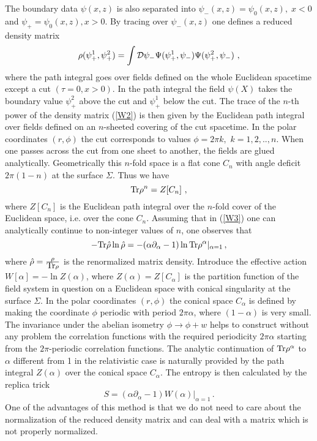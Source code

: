 \documentclass[12pt]{article}
\def\Tr{\hbox{Tr}}
\def\lb{\label}
\begin{document}
The boundary data $\psi(x,z)$ is also
separated into $\psi_-(x,z)=\psi_0(x,z),\; x<0$ and
$\psi_+=\psi_0(x,z),x>0$. By tracing over $\psi_-(x,z)$ one defines a reduced
density matrix
 \begin{equation}
  \rho(\psi_+^1,\psi_+^2)=\int {\cal D}\psi_-\Psi(\psi_+^1,\psi_-)\Psi(\psi_+^2,\psi_-)~,
 \lb{W2}
 \end{equation}
where the path integral goes over fields defined on the whole
Euclidean spacetime except a cut $(\tau=0,x>0)$. In the path
integral the field $\psi(X)$ takes the boundary value $\psi_+^2$
above the cut and $\psi_+^1$ below the cut. The trace of the $n$-th
power of the density matrix (\ref{W2})  is then  given by the
Euclidean path integral over fields defined on an $n$-sheeted
covering  of the cut spacetime. In the polar coordinates
$(r,\phi)$ the cut corresponds to values $\phi=2\pi k,$
$k=1,2,..,n$. When one passes across the cut from one sheet to
another, the fields are glued analytically. Geometrically this
$n$-fold space is a flat cone $C_n$ with angle deficit $2\pi(1-n)$
at the surface $\Sigma$. Thus we have
 \begin{equation}
  \Tr\rho^n=Z[C_n]~,
 \lb{W3}
 \end{equation}
where $Z[C_n]$ is the Euclidean path integral over the $n$-fold cover of the Euclidean space, i.e. over the cone $C_n$.
Assuming that in (\ref{W3}) one can analytically continue to
non-integer values of $n$, one  observes that 
$$-\Tr \hat{\rho} \ln
\hat{\rho}=-(\alpha\partial_\alpha-1)\ln\Tr
\rho^\alpha|_{\alpha=1}\, ,
$$
 where $\hat{\rho}=\frac{\rho}{ \Tr\rho}$ is
the renormalized matrix density. Introduce the effective action
$W[\alpha]=-\ln Z(\alpha)$, where $Z(\alpha)=Z[C_\alpha]$ is the
partition function of the field system in question on a Euclidean
space with conical singularity at the surface $\Sigma$. In the
polar coordinates $(r,\phi)$ the conical space $C_\alpha$  is
defined by making the coordinate $\phi$ periodic with  period
$2\pi\alpha$, where $(1-\alpha)$ is very small. The invariance under the abelian isometry $\phi\rightarrow \phi+w$
helps to construct without any problem the correlation functions  with the required periodicity $2\pi\alpha$ starting from the $2\pi$-periodic correlation functions. The analytic continuation of $\Tr \rho^\alpha$ to $\alpha$ different from 1 in the relativistic case is naturally provided by the path integral $Z(\alpha)$ over the conical space $C_\alpha$.
 The entropy  is then calculated by the replica trick
 \begin{equation}  \lb{SS}
  S=(\alpha\partial_\alpha-1)W(\alpha)|_{\alpha=1}\, .
 \end{equation}
One of the advantages of this method is that we do not need to care about the normalization of the
reduced density matrix and can deal with a matrix which is not properly normalized. 
\end{document}
